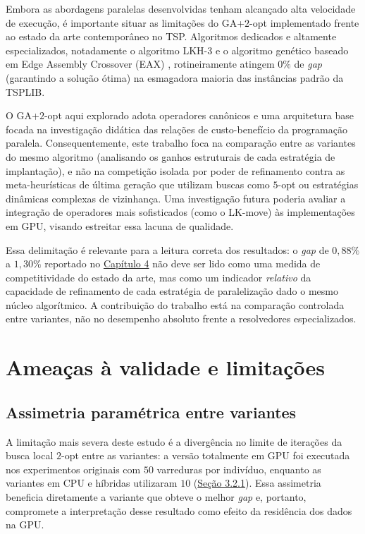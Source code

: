 Embora as abordagens paralelas desenvolvidas tenham alcançado alta velocidade de execução, é importante situar as limitações do GA+\(2\)-opt implementado frente ao estado da arte contemporâneo no TSP.
Algoritmos dedicados e altamente especializados, notadamente o algoritmo LKH-3 \autocite{helsgaun2000effective} e o algoritmo genético baseado em Edge Assembly Crossover (EAX) \autocite{nagata2013powerful}, rotineiramente atingem \(0\%\) de \emph{gap} (garantindo a solução ótima) na esmagadora maioria das instâncias padrão da TSPLIB.

O GA+\(2\)-opt aqui explorado adota operadores canônicos e uma arquitetura base focada na investigação didática das relações de custo-benefício da programação paralela.
Consequentemente, este trabalho foca na comparação entre as variantes do mesmo algoritmo (analisando os ganhos estruturais de cada estratégia de implantação), e não na competição isolada por poder de refinamento contra as meta-heurísticas de última geração que utilizam buscas como \(5\)-opt ou estratégias dinâmicas complexas de vizinhança.
Uma investigação futura poderia avaliar a integração de operadores mais sofisticados (como o LK-move) às implementações em GPU, visando estreitar essa lacuna de qualidade.

Essa delimitação é relevante para a leitura correta dos resultados: o \emph{gap} de \(0{,}88\%\) a \(1{,}30\%\) reportado no \hyperref[cap4-resultados]{Capítulo 4} não deve ser lido como uma medida de competitividade do estado da arte, mas como um indicador \emph{relativo} da capacidade de refinamento de cada estratégia de paralelização dado o mesmo núcleo algorítmico.
A contribuição do trabalho está na comparação controlada entre variantes, não no desempenho absoluto frente a resolvedores especializados.

\section{Ameaças à validade e limitações}\label{sec-53-ameacas-validade}

\subsection{Assimetria paramétrica entre variantes}\label{sec-531-assimetria-parametrica}

A limitação mais severa deste estudo é a divergência no limite de iterações da busca local \(2\)-opt entre as variantes: a versão totalmente em GPU foi executada nos experimentos originais com \(50\) varreduras por indivíduo, enquanto as variantes em CPU e híbridas utilizaram \(10\) (\hyperref[sec-321-ga-base]{Seção 3.2.1}).
Essa assimetria beneficia diretamente a variante que obteve o melhor \emph{gap} e, portanto, compromete a interpretação desse resultado como efeito da residência dos dados na GPU.

